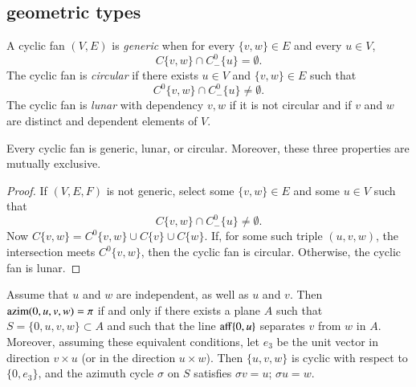 \subsection{geometric types}

\begin{definition}
A cyclic fan $(V,E)$ is {\it generic} when for every $\{v,w\}\in E$
and every $u\in V$, 
$$
C\{v,w\}\cap C^0_-\{u\} = \emptyset.
$$
The cyclic fan is {\it circular} if there exists $u\in V$ and $\{v,w\}\in E$ such that 
$$
C^0\{v,w\}\cap C^0_-\{u\}\ne \emptyset.
$$
The cyclic fan is {\it lunar} with dependency $v,w$ if it is not circular and if $v$ and $w$ are distinct and dependent elements of $V$.
\end{definition}

\begin{lemma} Every cyclic fan is
generic, lunar, or circular.  Moreover, these three properties are mutually exclusive.
\end{lemma}

\begin{proof} If $(V,E,F)$ is not generic,  select some $\{v,w\}\in E$
and some $u\in V$ such that
$$
C\{v,w\}\cap C^0_-\{u\} \ne \emptyset.
$$
Now $C\{v,w\} = C^0\{v,w\} \cup C\{v\}\cup C\{w\}$.  
If, for some such triple $(u,v,w)$, the intersection meets $C^0\{v,w\}$, then the cyclic fan is circular.  
Otherwise, the cyclic fan is lunar. 
\end{proof}

\begin{lemma}  \label{lemma:coplanar}
Assume that $u$ and $w$ are independent, as well as $u$ and $v$.  Then ${\operatorname{azim}}(0,u,v,w)=\pi$
if and only if there exists a plane $A$ such that
$S=\{0,u,v,w\}\subset A$ and such that the line ${\operatorname{aff}}\{0,u\}$ separates $v$ from $w$ in $A$.
Moreover, assuming these equivalent conditions, 
let $e_3$ be the unit vector in direction $v\times u$ (or in the direction $u\times w$).  Then
$\{u,v,w\}$ is cyclic with respect to $\{0,e_3\}$, and the azimuth cycle $\sigma$ on $S$ satisfies $\sigma v = u$; $\sigma u = w$.  
\end{lemma}

